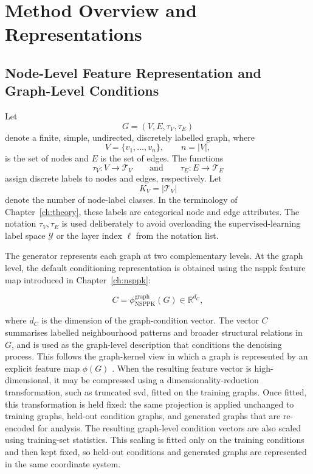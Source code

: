 \section{Method Overview and Representations}
\label{sec:generator:method-overview}


\subsection{Node-Level Feature Representation and Graph-Level Conditions}
\label{sec:generator:representation}

Let
\[
    G=(V,E,\tau_V,\tau_E)
\]
denote a finite, simple, undirected, discretely labelled graph, where
\[
    V=\{v_1,\ldots,v_n\},
    \qquad
    n=|V|,
\]
is the set of nodes and \(E\) is the set of edges. The functions
\[
    \tau_V:V\to\mathcal{T}_V
    \qquad\text{and}\qquad
    \tau_E:E\to\mathcal{T}_E
\]
assign discrete labels to nodes and edges, respectively. Let
\[
    K_V = |\mathcal{T}_V|
\]
denote the number of node-label classes.
In the terminology of Chapter~\ref{ch:theory}, these labels are categorical
node and edge attributes. The notation \(\tau_V,\tau_E\) is used deliberately
to avoid overloading the supervised-learning label space \(\mathcal{Y}\) or
the layer index \(\ell\) from the notation list.

The generator represents each graph at two complementary levels. At the graph
level, the default conditioning representation is obtained using the
\gls{nsppk} feature map introduced in Chapter~\ref{ch:nsppk}:

\[
    C
    =
    \phi_{\mathrm{NSPPK}}^{\mathrm{graph}}(G)
    \in
    \mathbb{R}^{d_C},
\]

where \(d_C\) is the dimension of the graph-condition vector. The vector \(C\)
summarises labelled neighbourhood patterns and broader structural relations in
\(G\), and is used as the graph-level description that conditions the denoising
process. This follows the graph-kernel view in which a graph is represented by
an explicit feature map \(\phi(G)\)
\citep{costa2010fast,borgwardt2005shortest,neumann2016propagation}. When the
resulting feature vector is high-dimensional, it may be compressed using a
dimensionality-reduction transformation, such as truncated \gls{svd}, fitted on
the training graphs. Once fitted, this transformation is held fixed: the same
projection is applied unchanged to training graphs, held-out condition graphs,
and generated graphs that are re-encoded for analysis.
The resulting graph-level condition vectors are also scaled using training-set
statistics. This scaling is fitted only on the training conditions and then
kept fixed, so held-out conditions and generated graphs are represented in the
same coordinate system.

